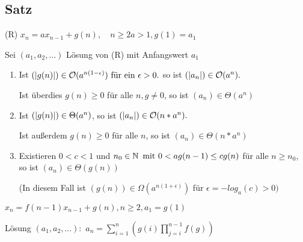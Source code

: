 \subsection*{Satz}
(R) $x_n = ax_{n-1}+g(n),\quad n \geq 2 a> 1, g(1) = a_1$

Sei $(a_1,a_2,...)$ Lösung von (R) mit Anfangswert $a_1$

\begin{enumerate}
	\item Ist $(\left|g(n)\right|) \in \mathcal{O}(a^{n(1-\epsilon)}) \text{ für ein } \epsilon > 0.$ so ist $(\left|a_n\right|)\in \mathcal{O}(a^n).$
	
	Ist überdies $g(n) \geq 0$ für alle $n, g \neq 0$, so ist $(a_n)\in \Theta(a^n)$ 
	
	\item Ist $(\left|g(n)\right|) \in \Theta(a^n)$, so ist $(\left|a_n\right|)\in \mathcal{O}(n*a^n).$
	
	Ist außerdem $g(n) \geq 0$ für alle $n$,  so ist $(a_n) \in \Theta(n*a^n)$

	\item Existieren $0 < c < 1$ und $n_0 \in \operatorname{\mathbb{N}} \text{ mit } 0<ag(n-1)\leq cg(n)$ für alle $n\geq n_0$, so ist $(a_n) \in \Theta(g(n))$
	
	(In diesem Fall ist $(g(n))\in \Omega(a^{n(1+\epsilon)})$ für $\epsilon = -log_a(c) >0)$
\end{enumerate}

$x_n = f(n-1)x_{n-1}+g(n), n \geq 2, a_1 = g(1)$

Lösung $(a_1,a_2,...):$ $a_n = \sum_{i=1}^{n}(g(i)\prod_{j=i}^{n-1}f(g))$

